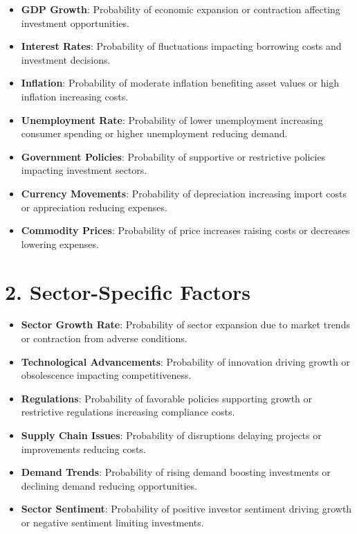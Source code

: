 \documentclass[
]{book}
\providecommand{\tightlist}{%
  \setlength{\itemsep}{0pt}\setlength{\parskip}{0pt}}
\begin{document}
\begin{itemize}
\tightlist
\item
  \textbf{GDP Growth}: Probability of economic expansion or contraction affecting investment opportunities.\\
\item
  \textbf{Interest Rates}: Probability of fluctuations impacting borrowing costs and investment decisions.\\
\item
  \textbf{Inflation}: Probability of moderate inflation benefiting asset values or high inflation increasing costs.\\
\item
  \textbf{Unemployment Rate}: Probability of lower unemployment increasing consumer spending or higher unemployment reducing demand.\\
\item
  \textbf{Government Policies}: Probability of supportive or restrictive policies impacting investment sectors.\\
\item
  \textbf{Currency Movements}: Probability of depreciation increasing import costs or appreciation reducing expenses.\\
\item
  \textbf{Commodity Prices}: Probability of price increases raising costs or decreases lowering expenses.
\end{itemize}

\section{2. Sector-Specific Factors}\label{sector-specific-factors}

\begin{itemize}
\tightlist
\item
  \textbf{Sector Growth Rate}: Probability of sector expansion due to market trends or contraction from adverse conditions.\\
\item
  \textbf{Technological Advancements}: Probability of innovation driving growth or obsolescence impacting competitiveness.\\
\item
  \textbf{Regulations}: Probability of favorable policies supporting growth or restrictive regulations increasing compliance costs.\\
\item
  \textbf{Supply Chain Issues}: Probability of disruptions delaying projects or improvements reducing costs.\\
\item
  \textbf{Demand Trends}: Probability of rising demand boosting investments or declining demand reducing opportunities.\\
\item
  \textbf{Sector Sentiment}: Probability of positive investor sentiment driving growth or negative sentiment limiting investments.
\end{itemize}
\end{document}
